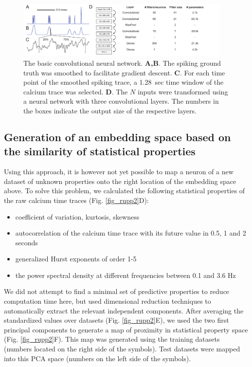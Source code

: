 \documentclass[10pt,letterpaper]{article}
\begin{document}
\begin{figure}[bt]
\centering
\includegraphics[width=0.95\textwidth]{images/ConvolutionalNet}
\caption{The basic convolutional neural network. \textbf{A,B}. The spiking ground truth was smoothed to facilitate gradient descent. \textbf{C}. For each time point of the smoothed spiking trace, a 1.28~sec time window of the calcium trace was selected. \textbf{D}. The $N$ inputs were transformed using a neural network with three convolutional layers. The numbers in the boxes indicate the output size of the respective layers.}
\label{fig_rupp1}
\end{figure}

\subsection*{Generation of an embedding space based on the similarity of statistical properties}

Using this approach, it is however not yet possible to map a neuron of a new dataset of unknown properties onto the right location of the embedding space above. To solve this problem, we calculated the following statistical properties of the raw calcium time traces (Fig. \ref{fig_rupp2}D):
\begin{itemize}
\item coefficient of variation, kurtosis, skewness
\item autocorrelation of the calcium time trace with its future value in 0.5, 1 and 2 seconds
\item generalized Hurst exponents of order 1-5
\item the power spectral density at different frequencies between 0.1 and 3.6 Hz
\end{itemize}
We did not attempt to find a minimal set of predictive properties to reduce computation time here, but used dimensional reduction techniques to automatically extract the relevant independent components. After averaging the standardized values over datasets (Fig. \ref{fig_rupp2}E), we used the two first principal components to generate a map of proximity in statistical property space (Fig. \ref{fig_rupp2}F). This map was generated using the training datasets (numbers located on the right side of the symbols). Test datasets were mapped into this PCA space (numbers on the left side of the symbols).
\end{document}
